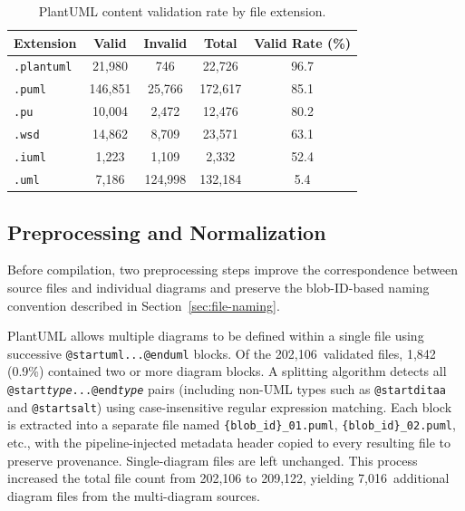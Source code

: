\documentclass[data,datadescriptor,submit,pdftex,moreauthors]{Definitions/mdpi}
\begin{document}
\begin{table}[H]
\caption{PlantUML content validation rate by file extension.\label{tab:extension-validation}}
\begin{tabularx}{\textwidth}{lCCCC}
\toprule
\textbf{Extension} & \textbf{Valid} & \textbf{Invalid} & \textbf{Total} & \textbf{Valid Rate (\%)} \\
\midrule
\texttt{.plantuml} & 21,980  & 746     & 22,726  & 96.7 \\
\texttt{.puml}     & 146,851 & 25,766  & 172,617 & 85.1 \\
\texttt{.pu}       & 10,004  & 2,472   & 12,476  & 80.2 \\
\texttt{.wsd}      & 14,862  & 8,709   & 23,571  & 63.1 \\
\texttt{.iuml}     & 1,223   & 1,109   & 2,332   & 52.4 \\
\texttt{.uml}      & 7,186   & 124,998 & 132,184 & 5.4 \\
\bottomrule
\end{tabularx}
\end{table}

\subsection{Preprocessing and Normalization}
\label{sec:preprocessing}

Before compilation, two preprocessing steps improve the correspondence between source files and individual diagrams and preserve the blob-ID-based naming convention described in Section~\ref{sec:file-naming}.

PlantUML allows multiple diagrams to be defined within a single file using successive \texttt{@startuml...@enduml} blocks. Of the 202,106~validated files, 1,842 (0.9\%) contained two or more diagram blocks. A splitting algorithm detects all \texttt{@start\textit{type}...@end\textit{type}} pairs (including non-UML types such as \texttt{@startditaa} and \texttt{@startsalt}) using case-insensitive regular expression matching. Each block is extracted into a separate file named \texttt{\{blob\_id\}\_01.puml}, \texttt{\{blob\_id\}\_02.puml}, etc., with the pipeline-injected metadata header copied to every resulting file to preserve provenance. Single-diagram files are left unchanged. This process increased the total file count from 202,106 to 209,122, yielding 7,016~additional diagram files from the multi-diagram sources.
\end{document}
